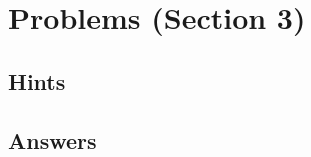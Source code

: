 

\pagestyle{fancy}%
\fancyhead[L]{\textsc{\rightmark}}%
\fancyhead[C]{}%
\fancyhead[R]{\thepage}
\fancyfoot{}%
\renewcommand{\contentsname}{Contents}%


\setcounter{section}{2}
\section{Problems (Section 3)}
\subsection{Hints}


\subsection{Answers}





